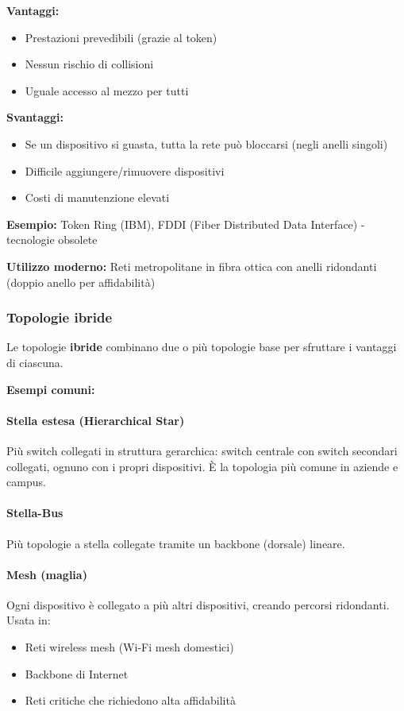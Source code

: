 \documentclass[12pt,a4paper]{article}
\begin{document}
\textbf{Vantaggi:}
\begin{itemize}
    \item Prestazioni prevedibili (grazie al token)
    \item Nessun rischio di collisioni
    \item Uguale accesso al mezzo per tutti
\end{itemize}

\textbf{Svantaggi:}
\begin{itemize}
    \item Se un dispositivo si guasta, tutta la rete può bloccarsi (negli anelli singoli)
    \item Difficile aggiungere/rimuovere dispositivi
    \item Costi di manutenzione elevati
\end{itemize}

\textbf{Esempio:} Token Ring (IBM), FDDI (Fiber Distributed Data Interface) - tecnologie obsolete

\textbf{Utilizzo moderno:} Reti metropolitane in fibra ottica con anelli ridondanti (doppio anello per affidabilità)

\subsubsection{Topologie ibride}

Le topologie \textbf{ibride} combinano due o più topologie base per sfruttare i vantaggi di ciascuna.

\textbf{Esempi comuni:}

\paragraph{Stella estesa (Hierarchical Star)}
Più switch collegati in struttura gerarchica: switch centrale con switch secondari collegati, ognuno con i propri dispositivi. È la topologia più comune in aziende e campus.

\paragraph{Stella-Bus}
Più topologie a stella collegate tramite un backbone (dorsale) lineare.

\paragraph{Mesh (maglia)}
Ogni dispositivo è collegato a più altri dispositivi, creando percorsi ridondanti. Usata in:
\begin{itemize}
    \item Reti wireless mesh (Wi-Fi mesh domestici)
    \item Backbone di Internet
    \item Reti critiche che richiedono alta affidabilità
\end{itemize}
\end{document}
